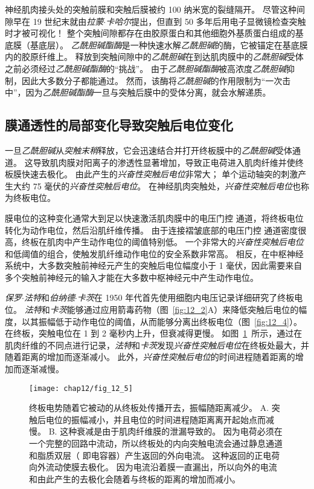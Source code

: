 神经肌肉接头处的突触前膜和突触后膜被约 100 纳米宽的裂缝隔开。
尽管这种间隙早在 19 世纪末就由\textit{拉蒙$\cdot$卡哈尔}提出，但直到 50 多年后用电子显微镜检查突触时才被可视化！
整个突触间隙都存在由胶原蛋白和其他细胞外基质蛋白组成的基底膜（基底层）。
\textit{乙酰胆碱酯酶}是一种快速水解\textit{乙酰胆碱}的酶，它被锚定在基底膜内的胶原纤维上。
释放到突触间隙中的\textit{乙酰胆碱}在到达肌肉膜中的\textit{乙酰胆碱}受体之前必须经过\textit{乙酰胆碱酯酶}的“挑战”。
由于\textit{乙酰胆碱酯酶}被高浓度\textit{乙酰胆碱}抑制，因此大多数分子都能通过。
然而，该酶将\textit{乙酰胆碱}的作用限制为“一次击中”，因为\textit{乙酰胆碱酯酶}一旦与突触后膜中的受体分离，就会水解递质。



\subsection{膜通透性的局部变化导致突触后电位变化}

一旦\textit{乙酰胆碱}从\textit{突触末稍}释放，它会迅速结合并打开终板膜中的\textit{乙酰胆碱}受体通道。
这导致肌肉膜对阳离子的渗透性显著增加，导致正电荷进入肌肉纤维并使终板膜快速去极化。
由此产生的\textit{兴奋性突触后电位}非常大；
单个运动轴突的刺激产生大约 75 毫伏的\textit{兴奋性突触后电位}。
在神经肌肉突触处，\textit{兴奋性突触后电位}也称为终板电位。


膜电位的这种变化通常大到足以快速激活肌肉膜中的电压门控  通道，将终板电位转化为动作电位，然后沿肌纤维传播。
由于连接褶皱底部的电压门控  通道密度很高，终板在肌肉中产生动作电位的阈值特别低。
一个非常大的\textit{兴奋性突触后电位}和低阈值的组合，使触发肌纤维动作电位的安全系数非常高。
相反，在中枢神经系统中，大多数突触前神经元产生的突触后电位幅度小于 1 毫伏，因此需要来自多个突触前神经元的输入才能在大多数中枢神经元中产生动作电位。


\textit{保罗$\cdot$法特}和\textit{伯纳德$\cdot$卡茨}在 1950 年代首先使用细胞内电压记录详细研究了终板电位。
\textit{法特}和\textit{卡茨}能够通过应用箭毒药物（图~\ref{fig:12_2}A）来降低突触后电位的幅度，以其振幅低于动作电位的阈值，从而能够分离出终板电位（图~\ref{fig:12_4}）。
在终板，突触电位在 1 到 2 毫秒内上升，但衰减得更慢。
如图~\ref{fig:12_5}~所示，通过在肌肉纤维的不同点进行记录，\textit{法特}和\textit{卡茨}发现\textit{兴奋性突触后电位}在终板处最大，并随着距离的增加而逐渐减小。
此外，\textit{兴奋性突触后电位}的时间进程随着距离的增加而逐渐减慢。


\begin{figure}[htbp]
	\centering
	\texttt{[image: chap12/fig\_12\_5]}
	\caption{终板电势随着它被动的从终板处传播开去，振幅随距离减少。
		A. 突触后电位的振幅减小，并且电位的时间进程随距离离开起始点而减慢。
		B. 这种衰减是由于肌肉纤维膜的泄漏导致的。
		因为电荷必须在一个完整的回路中流动，所以终板处的内向突触电流会通过静息通道和脂质双层（ 即电容器）产生返回的外向电流。 
		这种返回的正电荷向外流动使膜去极化。 
		因为电流沿着膜一直漏出，所以向外的电流和由此产生的去极化会随着与终板的距离的增加而减小。}
	\label{fig:12_5}
\end{figure}


